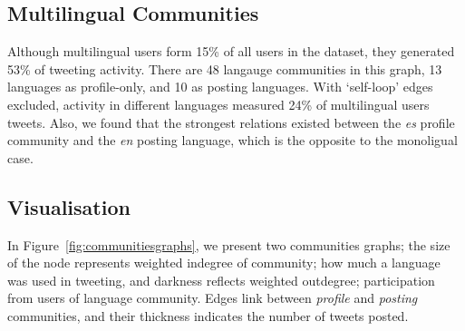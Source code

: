 \documentclass{llncs}
\begin{document}

\subsection{Multilingual Communities}

Although multilingual users form 15\% of all users in the dataset,
they generated 53\% of tweeting activity. There are 48 langauge
communities in this graph, 13 languages as profile-only, and 10 as
posting languages. With `self-loop' edges excluded, activity in
different languages measured 24\% of multilingual users tweets. Also,
we found that the strongest relations existed between the \emph{es}
profile community and the \emph{en} posting language, which is the
opposite to the monoligual case.


\subsection{Visualisation}

In Figure~\ref{fig:communitiesgraphs}, we present two communities
graphs; the size of the node represents weighted indegree of
community; how much a language was used in tweeting, and darkness
reflects weighted outdegree; participation from users of language
community. Edges link between \emph{profile} and \emph{posting}
communities, and their thickness indicates the number of tweets
posted.
\end{document}
